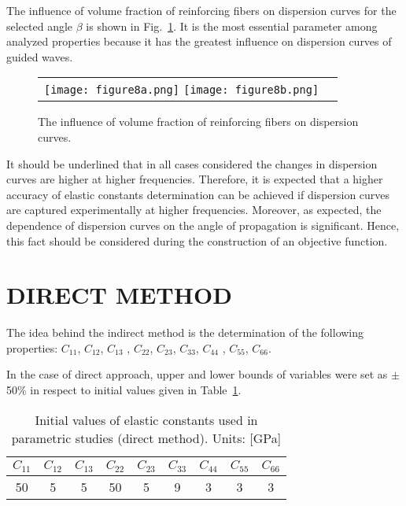 \documentclass[]{spie}  %
\newcommand{\myfigscale}{0.9}
\begin{document}
The influence of volume fraction of reinforcing fibers on dispersion curves for the selected angle \(\beta\) is shown in Fig.~\ref{fig:vol}. 
It is the most essential parameter among analyzed properties because it has the greatest influence on dispersion curves of guided waves.
\begin{figure} [ht]
	\begin{center}
		\begin{tabular}{cc} %
			\texttt{[image: figure8a.png]}
			\texttt{[image: figure8b.png]}
		\end{tabular}
	\end{center}
	\caption[] 
	{ \label{fig:vol} 
		The influence of volume fraction of reinforcing fibers on dispersion curves.}
\end{figure} 

It should be underlined that in all cases considered the changes in dispersion curves are higher at higher frequencies. 
Therefore, it is expected that a higher accuracy of elastic constants determination can be achieved if dispersion curves are captured experimentally at higher frequencies. Moreover, as expected, the dependence of dispersion curves on the angle of propagation is significant. 
Hence, this fact should be considered during the construction of an objective function.

\section{DIRECT METHOD}
\label{sec:direct}

The idea behind the indirect method is the determination of the following properties:
\(C_{11}\), \(C_{12}\), \(C_{13}\) , \(C_{22}\), \(C_{23}\), \(C_{33}\), \(C_{44}\) , \(C_{55}\), 
\(C_{66}\).

In the case of direct approach, upper and lower bounds of variables were set as  
\(\pm\)50\% in respect to initial values given in Table~\ref{tab:Ctensor_initial}.
\begin{table}[h!]
	\renewcommand{\arraystretch}{1.3}
	\caption{Initial values of elastic constants used in parametric studies (direct method). 
	Units: [GPa]}
		\label{tab:Ctensor_initial}
	\begin{center}
		\begin{tabular}{ccccccccc} 
			\toprule
			\(C_{11}\) & \(C_{12}\) & \(C_{13}\)  & \(C_{22}\) & \(C_{23}\) & \(C_{33}\) & 
			\(C_{44}\)  & \(C_{55}\) & \(C_{66}\) \\
			\midrule
			50 &5& 5&  50 & 5 & 9 & 3 & 3 & 3\\
			\bottomrule 
		\end{tabular} 
	\end{center}
\end{table}
\end{document}
